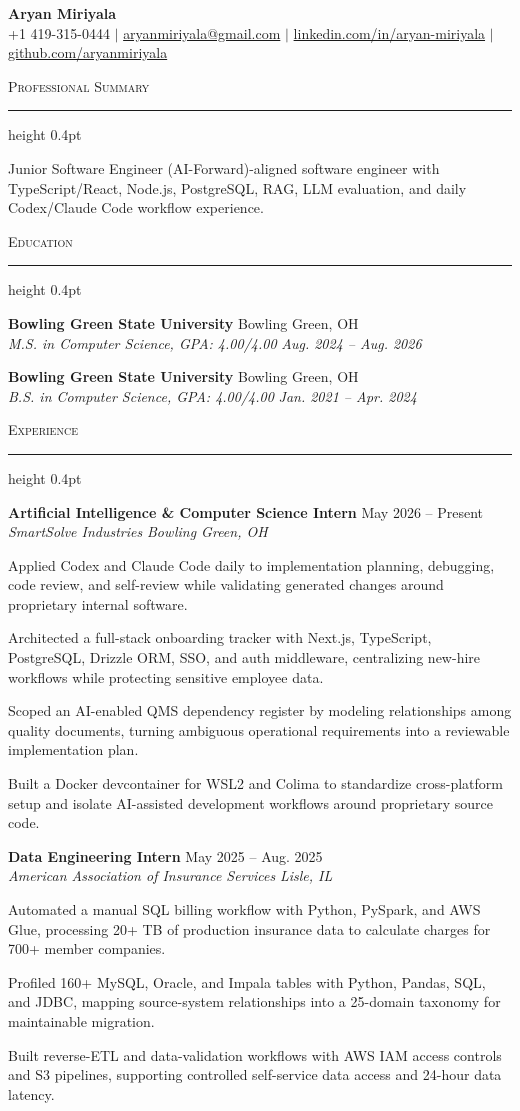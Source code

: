 \documentclass[letterpaper,11pt]{article}
\newcommand{\resumesection}[1]{%
  \par\vspace{2pt}%
  {\large\scshape #1}\par\vspace{2pt}%
  \hrule height 0.4pt\vspace{2pt}%
}
\newcommand{\resumeSubheading}[4]{
  \textbf{#1} \hfill #2\\
  \textit{#3} \hfill \textit{#4}
}
\begin{document}
\begin{center}
  {\LARGE \textbf{Aryan Miriyala}}\\[-1pt]
  \small
  +1 419-315-0444 $|$
  \href{mailto:aryanmiriyala@gmail.com}{aryanmiriyala@gmail.com} $|$
  \href{https://www.linkedin.com/in/aryan-miriyala-7788a21b6/}{linkedin.com/in/aryan-miriyala} $|$
  \href{https://github.com/aryanmiriyala}{github.com/aryanmiriyala}
\end{center}\vspace{-10pt}

\resumesection{Professional Summary}
Junior Software Engineer (AI-Forward)-aligned software engineer with TypeScript/React, Node.js, PostgreSQL, RAG, LLM evaluation, and daily Codex/Claude Code workflow experience.

\resumesection{Education}
\resumeSubheading
{Bowling Green State University}{Bowling Green, OH}
{M.S. in Computer Science, GPA: 4.00/4.00}{Aug. 2024 -- Aug. 2026}

\resumeSubheading
{Bowling Green State University}{Bowling Green, OH}
{B.S. in Computer Science, GPA: 4.00/4.00}{Jan. 2021 -- Apr. 2024}

\resumesection{Experience}
\resumeSubheading
{Artificial Intelligence \& Computer Science Intern}{May 2026 -- Present}
{SmartSolve Industries}{Bowling Green, OH}
\begin{tightitemize}
  \item Applied Codex and Claude Code daily to implementation planning, debugging, code review, and self-review while validating generated changes around proprietary internal software.
  \item Architected a full-stack onboarding tracker with Next.js, TypeScript, PostgreSQL, Drizzle ORM, SSO, and auth middleware, centralizing new-hire workflows while protecting sensitive employee data.
  \item Scoped an AI-enabled QMS dependency register by modeling relationships among quality documents, turning ambiguous operational requirements into a reviewable implementation plan.
  \item Built a Docker devcontainer for WSL2 and Colima to standardize cross-platform setup and isolate AI-assisted development workflows around proprietary source code.
\end{tightitemize}

\resumeSubheading
{Data Engineering Intern}{May 2025 -- Aug. 2025}
{American Association of Insurance Services}{Lisle, IL}
\begin{tightitemize}
  \item Automated a manual SQL billing workflow with Python, PySpark, and AWS Glue, processing 20+ TB of production insurance data to calculate charges for 700+ member companies.
  \item Profiled 160+ MySQL, Oracle, and Impala tables with Python, Pandas, SQL, and JDBC, mapping source-system relationships into a 25-domain taxonomy for maintainable migration.
  \item Built reverse-ETL and data-validation workflows with AWS IAM access controls and S3 pipelines, supporting controlled self-service data access and 24-hour data latency.
\end{tightitemize}
\end{document}
